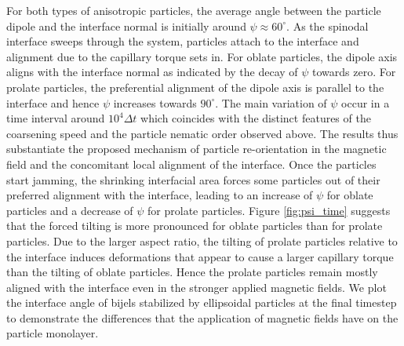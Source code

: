 For both types of anisotropic particles, the average angle between the
particle dipole and the interface normal is initially around
\(\psi\approx60^\circ\). As the spinodal interface sweeps through the
system, particles attach to the interface and alignment due to the
capillary torque sets in. For oblate particles, the dipole axis aligns
with the interface normal as indicated by the decay of \(\psi\) towards
zero. For prolate particles, the preferential alignment of the dipole
axis is parallel to the interface and hence \(\psi\) increases towards
\(90^\circ\). The main variation of \(\psi\) occur in a time interval
around \(10^4\Delta t\) which coincides with the distinct features of
the coarsening speed and the particle nematic order observed above. The
results thus substantiate the proposed mechanism of particle
re-orientation in the magnetic field and the concomitant local alignment
of the interface. Once the particles start jamming, the shrinking
interfacial area forces some particles out of their preferred alignment
with the interface, leading to an increase of \(\psi\) for oblate
particles and a decrease of \(\psi\) for prolate particles. Figure
\ref{fig:psi_time} suggests that the forced tilting is more pronounced
for oblate particles than for prolate particles. Due to the larger
aspect ratio, the tilting of prolate particles relative to the interface
induces deformations that appear to cause a larger capillary torque than
the tilting of oblate particles. %
Hence the prolate particles remain mostly aligned with the interface
even in the stronger applied magnetic fields. We plot the interface angle of bijels
stabilized by ellipsoidal particles at the final timestep to demonstrate the differences
that the application of magnetic fields have on the particle monolayer.

